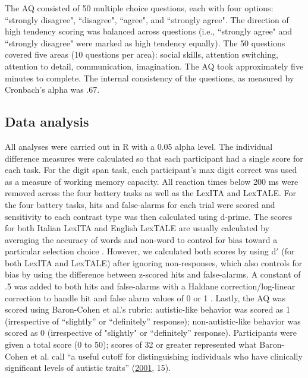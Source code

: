 The AQ \citep{Baron-Cohen2001} consisted of 50 multiple choice questions, each with four options: ``strongly disagree", ``disagree", ``agree", and ``strongly agree". The direction of high tendency scoring was balanced across questions (i.e., ``strongly agree" and ``strongly disagree" were marked as high tendency equally). The 50 questions covered five areas (10 questions per area): social skills, attention switching, attention to detail, communication, imagination. The AQ took approximately five minutes to complete. The internal consistency of the questions, as measured by Cronbach’s alpha was .67.


\subsection{Data analysis}

All analyses were carried out in R \citep[version 4.2.2;][]{R} with a 0.05 alpha level. The individual difference measures were calculated so that each participant had a single score for each task. For the digit span task, each participant's max digit correct was used as a measure of working memory capacity. All reaction times below 200 ms were removed across the four battery tasks as well as the LexITA and LexTALE. For the four battery tasks, hits and false-alarms for each trial were scored and sensitivity to each contrast type was then calculated using d-prime. The scores for both Italian LexITA and English LexTALE are usually calculated by averaging the accuracy of words and non-word to control for bias toward a particular selection choice \citep{lemhofer2012introducing}. However, we calculated both scores by using d$'$ (for both LexITA and LexTALE) after ignoring non-responses, which also controls for bias by using the difference between z-scored hits and false-alarms. A constant of .5 was added to both hits and false-alarms with a Haldane correction/log-linear correction to handle hit and false alarm values of 0 or 1 \citep{Hautus1995}. Lastly, the AQ was scored using Baron-Cohen et al.'s rubric: autistic-like behavior was scored as 1 (irrespective of “slightly” or “definitely” response); non-autistic-like behavior was scored as 0 (irrespective of "slightly" or “definitely” response). Participants were given a total score (0 to 50); scores of 32 or greater represented what Baron-Cohen et al. call “a useful cutoff for distinguishing individuals who have clinically significant levels of autistic traits” (\href{https://cognitiveresearchjournal.springeropen.com/articles/10.1186/s41235-022-00439-w\#ref-CR5}{2001}, 15). 

